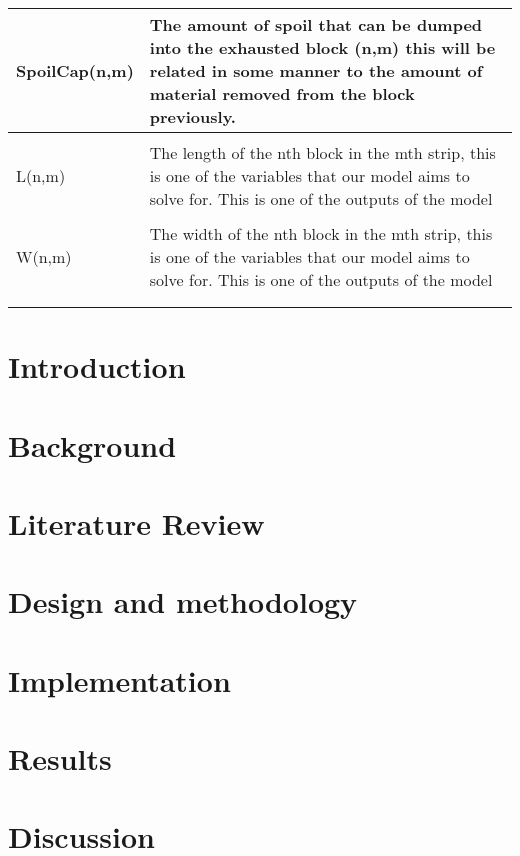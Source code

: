\documentclass[12pt, openany, a4paper]{book}
\begin{document}
\begin{table}[h!]
\begin{tabular}{p{5cm} p{11cm}}
		SpoilCap(n,m) & The amount of spoil that can be dumped into the exhausted block (n,m) this will be related in some manner to the amount of material removed from the block previously.
		\\
		\hline \\
		L(n,m) & The length of the nth block in the mth strip, this is one of the variables that our model aims to solve for. This is one of the outputs of the model \\ \hline \\ 
		W(n,m) & The width of the nth block in the mth strip, this is one of the variables that our model aims to solve for. This is one of the outputs of the model \\ \hline \\ 
		\label{tab:var}
	\end{tabular}	
\end{table}
\newpage
\chapter{Introduction}


\chapter{Background}


\chapter{Literature Review}


\chapter{Design and methodology}


\chapter{Implementation}


\chapter{Results}


\chapter{Discussion}

\end{document}
